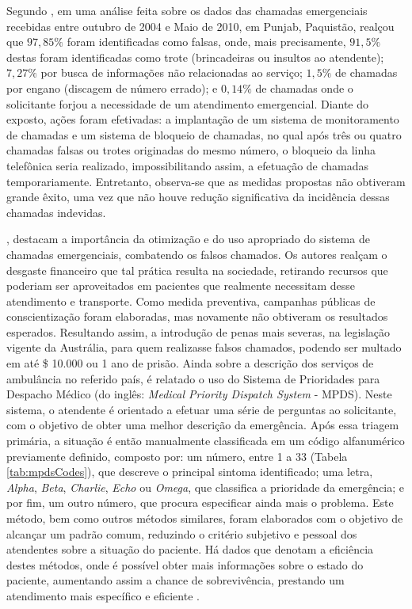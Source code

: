 Segundo \cite{waseem2010prank}, em uma análise feita sobre os dados das chamadas emergenciais recebidas entre outubro de 2004 e Maio de 2010, em Punjab, Paquistão, realçou que $97,85\%$ foram identificadas como falsas, onde, mais precisamente, $91,5\%$ destas foram identificadas como trote (brincadeiras ou insultos ao atendente); $7,27\%$ por busca de informações não relacionadas ao serviço; $1,5\%$ de chamadas por engano (discagem de número errado); e $0,14\%$ de chamadas onde o solicitante forjou a necessidade de um atendimento emergencial. 
Diante do exposto, ações foram efetivadas: a implantação de um sistema de monitoramento de chamadas e um sistema de bloqueio de chamadas, no qual após três ou quatro chamadas falsas ou trotes originadas do mesmo número, o bloqueio da linha telefônica seria realizado, impossibilitando assim, a efetuação de chamadas temporariamente.
Entretanto, observa-se que as medidas propostas não obtiveram grande êxito, uma vez que não houve redução significativa da incidência dessas chamadas indevidas.

\cite{rashford2010optimizing}, destacam a importância da otimização e do uso apropriado do sistema de chamadas emergenciais, combatendo os falsos chamados. Os autores realçam o desgaste financeiro que tal prática resulta na sociedade, retirando recursos que poderiam ser aproveitados em pacientes que realmente necessitam desse atendimento e transporte. Como medida preventiva, campanhas públicas de conscientização foram elaboradas, mas novamente não obtiveram os resultados esperados. Resultando assim, a introdução de penas mais severas, na legislação vigente da Austrália,  para quem realizasse falsos chamados, podendo ser multado em até \$ 10.000 ou 1 ano de prisão. 
Ainda sobre a descrição dos serviços de ambulância no referido país, é relatado o uso do Sistema de Prioridades para Despacho Médico (do inglês: \textit{Medical Priority Dispatch System} - MPDS). Neste sistema, o atendente é orientado a efetuar uma série de perguntas ao solicitante, com o objetivo de obter uma melhor descrição da emergência. Após essa triagem primária, a situação é então manualmente classificada em um código alfanumérico previamente definido, composto por: um número, entre 1 a 33 (Tabela \ref{tab:mpdsCodes}), que descreve o principal sintoma identificado; uma letra, \textit{Alpha}, \textit{Beta}, \textit{Charlie}, \textit{Echo} ou \textit{Omega}, que classifica a prioridade da emergência; e por fim, um outro número, que procura especificar ainda mais o problema.
Este método, bem como outros métodos similares, foram elaborados com o objetivo de alcançar um padrão comum, reduzindo o critério subjetivo e pessoal dos atendentes sobre a situação do paciente. Há dados que denotam a eficiência destes métodos, onde é possível obter mais informações sobre o estado do paciente, aumentando assim a chance de sobrevivência, prestando um atendimento mais específico e eficiente \citep{gray2008ampds}.

